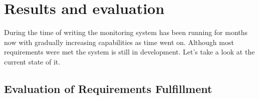 %

\chapter{Results and evaluation \label{ch6}}

During the time of writing the monitoring system has been running for months
now with gradually increasing capabilities as time went on. Although most
requirements were met the system is still in development. Let's take a look at
the current state of it.

\section{Evaluation of Requirements Fulfillment}

